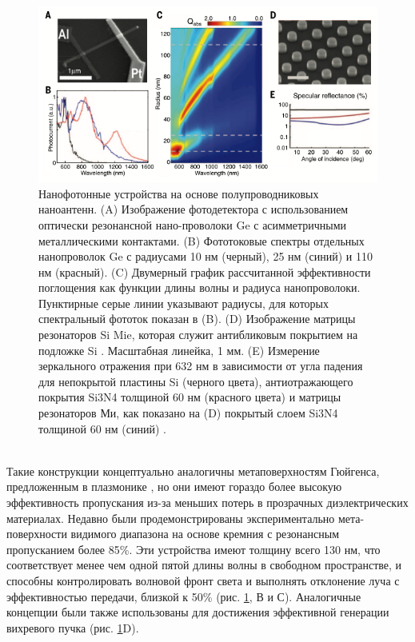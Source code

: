  \begin{figure}[h!]
	\centering
	\includegraphics[width=0.6\linewidth]{images/fig5.png}
	\caption{ Нанофотонные устройства на основе полупроводниковых наноантенн. (A) Изображение фотодетектора с использованием оптически резонансной нано-проволоки Ge с асимметричными металлическими контактами. (B) Фототоковые спектры отдельных нанопроволок Ge с радиусами 10 нм (черный), 25 нм (синий) и 110 нм (красный). (C) Двумерный график рассчитанной эффективности поглощения как функции длины волны и радиуса нанопроволоки. Пунктирные серые линии указывают радиусы, для которых спектральный фототок показан в (B). (D) Изображение матрицы резонаторов Si Mie, которая служит антибликовым покрытием на подложке Si \cite{spinelli2012broadband}. Масштабная линейка, 1 мм. (E) Измерение зеркального отражения при 632 нм в зависимости от угла падения для непокрытой пластины Si (черного цвета), антиотражающего покрытия Si3N4 толщиной 60 нм (красного цвета) и матрицы резонаторов Ми, как показано на (D) покрытый слоем Si3N4 толщиной 60 нм (синий) \cite{spinelli2012broadband}. }
	\label{nonliner:matasurf1}
\end{figure}
\\
\hspace*{2mm}
Такие конструкции концептуально аналогичны метаповерхностям Гюйгенса, предложенным в плазмонике \cite{pfeiffer2014efficient}, но они имеют гораздо более высокую эффективность пропускания из-за меньших потерь в прозрачных диэлектрических материалах. Недавно были продемонстрированы экспериментально мета-поверхности видимого диапазона на основе кремния с резонансным пропусканием более 85\%. Эти устройства имеют толщину всего 130 нм, что соответствует менее чем одной пятой длины волны в свободном пространстве, и способны контролировать волновой фронт света и выполнять отклонение луча с эффективностью передачи, близкой к 50\% (рис. \ref{nonliner:matasurf1}, В и С). Аналогичные концепции были также использованы для достижения эффективной генерации вихревого пучка (рис. \ref{nonliner:matasurf1}D). 
\\
\hspace*{2mm}
